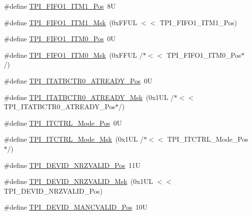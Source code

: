 \begin{DoxyCompactItemize}
\item 
\#define \mbox{\hyperlink{group__CMSIS__TPI_gaece86ab513bc3d0e0a9dbd82258af49f}{T\+P\+I\+\_\+\+F\+I\+F\+O1\+\_\+\+I\+T\+M1\+\_\+\+Pos}}~8U
\item 
\#define \mbox{\hyperlink{group__CMSIS__TPI_ga3347f42828920dfe56e3130ad319a9e6}{T\+P\+I\+\_\+\+F\+I\+F\+O1\+\_\+\+I\+T\+M1\+\_\+\+Msk}}~(0x\+F\+F\+U\+L $<$$<$ T\+P\+I\+\_\+\+F\+I\+F\+O1\+\_\+\+I\+T\+M1\+\_\+\+Pos)
\item 
\#define \mbox{\hyperlink{group__CMSIS__TPI_ga2188671488417a52abb075bcd4d73440}{T\+P\+I\+\_\+\+F\+I\+F\+O1\+\_\+\+I\+T\+M0\+\_\+\+Pos}}~0U
\item 
\#define \mbox{\hyperlink{group__CMSIS__TPI_ga8ae09f544fc1a428797e2a150f14a4c9}{T\+P\+I\+\_\+\+F\+I\+F\+O1\+\_\+\+I\+T\+M0\+\_\+\+Msk}}~(0x\+F\+F\+U\+L /$\ast$$<$$<$ T\+P\+I\+\_\+\+F\+I\+F\+O1\+\_\+\+I\+T\+M0\+\_\+\+Pos$\ast$/)
\item 
\#define \mbox{\hyperlink{group__CMSIS__TPI_gab1eb6866c65f02fa9c83696b49b0f346}{T\+P\+I\+\_\+\+I\+T\+A\+T\+B\+C\+T\+R0\+\_\+\+A\+T\+R\+E\+A\+D\+Y\+\_\+\+Pos}}~0U
\item 
\#define \mbox{\hyperlink{group__CMSIS__TPI_gaee320b3c60f9575aa96a8742c4ff9356}{T\+P\+I\+\_\+\+I\+T\+A\+T\+B\+C\+T\+R0\+\_\+\+A\+T\+R\+E\+A\+D\+Y\+\_\+\+Msk}}~(0x1\+U\+L /$\ast$$<$$<$ T\+P\+I\+\_\+\+I\+T\+A\+T\+B\+C\+T\+R0\+\_\+\+A\+T\+R\+E\+A\+D\+Y\+\_\+\+Pos$\ast$/)
\item 
\#define \mbox{\hyperlink{group__CMSIS__TPI_gaa847adb71a1bc811d2e3190528f495f0}{T\+P\+I\+\_\+\+I\+T\+C\+T\+R\+L\+\_\+\+Mode\+\_\+\+Pos}}~0U
\item 
\#define \mbox{\hyperlink{group__CMSIS__TPI_gad6f87550b468ad0920d5f405bfd3f017}{T\+P\+I\+\_\+\+I\+T\+C\+T\+R\+L\+\_\+\+Mode\+\_\+\+Msk}}~(0x1\+U\+L /$\ast$$<$$<$ T\+P\+I\+\_\+\+I\+T\+C\+T\+R\+L\+\_\+\+Mode\+\_\+\+Pos$\ast$/)
\item 
\#define \mbox{\hyperlink{group__CMSIS__TPI_ga9f46cf1a1708575f56d6b827766277f4}{T\+P\+I\+\_\+\+D\+E\+V\+I\+D\+\_\+\+N\+R\+Z\+V\+A\+L\+I\+D\+\_\+\+Pos}}~11U
\item 
\#define \mbox{\hyperlink{group__CMSIS__TPI_gacecc8710a8f6a23a7d1d4f5674daf02a}{T\+P\+I\+\_\+\+D\+E\+V\+I\+D\+\_\+\+N\+R\+Z\+V\+A\+L\+I\+D\+\_\+\+Msk}}~(0x1\+U\+L $<$$<$ T\+P\+I\+\_\+\+D\+E\+V\+I\+D\+\_\+\+N\+R\+Z\+V\+A\+L\+I\+D\+\_\+\+Pos)
\item 
\#define \mbox{\hyperlink{group__CMSIS__TPI_ga675534579d9e25477bb38970e3ef973c}{T\+P\+I\+\_\+\+D\+E\+V\+I\+D\+\_\+\+M\+A\+N\+C\+V\+A\+L\+I\+D\+\_\+\+Pos}}~10U
\item 

\end{DoxyCompactItemize}

